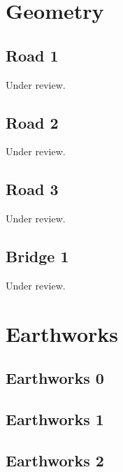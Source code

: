 \documentclass{scrartcl}
\begin{document}
\section{Geometry}

\subsection{Road 1}
\label{sec:road_1}
Under review.%
\clearpage

\subsection{Road 2}
\label{sec:road_2}
Under review.%
\clearpage

\subsection{Road 3}
\label{sec:road_3}
Under review.%
\clearpage

\subsection{Bridge 1}
\label{sec:bridge_1}
Under review.%
\clearpage

\section{Earthworks}

\subsection{Earthworks 0}
\label{sec:earth_0}
\clearpage

\subsection{Earthworks 1}
\label{sec:earth_1}
\clearpage

\subsection{Earthworks 2}
\label{sec:earth_2}
\clearpage
\end{document}
